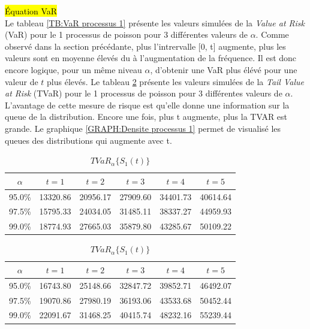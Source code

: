 \documentclass[12pt, french]{report}
\begin{document}
\hl{Équation VaR} \\
Le tableau \ref{TB:VaR processus 1} présente les valeurs simulées de la \emph{Value at Risk} (VaR) pour le 1 processus de poisson pour 3 différentes 
valeurs de $\alpha$. Comme observé dans la section précédante, plus l'intrervalle [0, t] augmente,
plus les valeurs sont en moyenne élevés du à l'augmentation de la fréquence. Il est donc encore logique, pour un même niveau $\alpha$, d'obtenir une VaR plus élévé 
pour une valeur de $t$ plus élevés. Le tableau \ref{TB:TVaR processus 1} présente les valeurs simulées de la \emph{Tail Value at Risk} (TVaR) pour le 1 processus 
de poisson pour 3 différentes valeurs de $\alpha$. L'avantage de cette mesure de risque est qu'elle donne une information sur la queue de la distribution.
Encore une fois, plus t augmente, plus la TVAR est grande. Le graphique \ref{GRAPH:Densite processus 1} permet de visualisé les queues des distributions qui 
augmente avec t. 

\begin{table}[ht]
    \centering
    \caption{$VaR_\alpha\{S_1(t)\}$}
    \label{TB:VaR processus 1}
    \begin{tabular}{|cccccc|}
      \hline
      $\alpha$ & $t=1$ & $t=2$ & $t=3$ & $t=4$ & $t=5$ \\ 
      \hline
      95.0\% & 13320.86 & 20956.17 & 27909.60 & 34401.73 & 40614.64 \\ 
      97.5\% & 15795.33 & 24034.05 & 31485.11 & 38337.27 & 44959.93 \\ 
      99.0\% & 18774.93 & 27665.03 & 35879.80 & 43285.67 & 50109.22 \\  
       \hline
    \end{tabular} 
    \vspace{0.4cm}
    \caption{$TVaR_\alpha\{S_1(t)\}$}
    \label{TB:TVaR processus 1}
    \begin{tabular}{|cccccc|}
        \hline
        $\alpha$ & $t=1$ & $t=2$ & $t=3$ & $t=4$ & $t=5$ \\
        \hline
        95.0\% & 16743.80 & 25148.66 & 32847.72 & 39852.71 & 46492.07 \\ 
        97.5\% & 19070.86 & 27980.19 & 36193.06 & 43533.68 & 50452.44 \\ 
        99.0\%& 22091.67 & 31468.25 & 40415.74 & 48232.16 & 55239.44 \\ 
        \hline
    \end{tabular}
\end{table}
\end{document}
